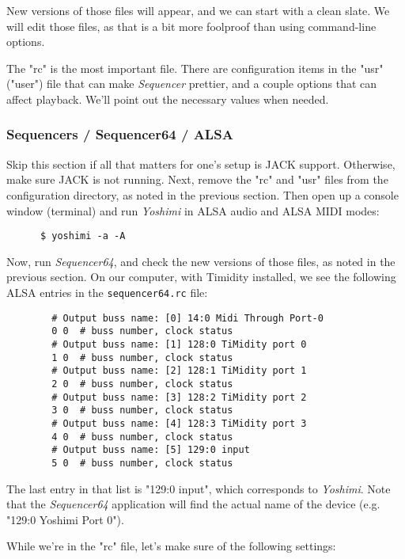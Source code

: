    New versions of those files will appear, and we can start with a clean
   slate.  We will edit those files, as that is a bit more foolproof than using
   command-line options.

   The "rc" is the most important file.  There are configuration items in the
   "usr" ("user") file that can make \textsl{Sequencer} prettier, and a couple
   options that can affect playback.  We'll point out the necessary values when
   needed.

\subsubsection{Sequencers / Sequencer64 / ALSA}
\label{subsubsec:sequencers_seq64_alsa}

   Skip this section if all that matters for one's setup is JACK support.
   Otherwise, make sure JACK is not running.
   Next, remove the "rc" and "usr" files from the configuration directory, as
   noted in the previous section.
   Then open up a console window (terminal) and run \textsl{Yoshimi} in ALSA
   audio and ALSA MIDI modes:

   \begin{verbatim}
      $ yoshimi -a -A
   \end{verbatim}

   Now, run \textsl{Sequencer64}, and check the new
   versions of those files, as noted in the previous section.
   On our computer, with Timidity installed, we see the following ALSA entries
   in the \texttt{sequencer64.rc} file:

   \begin{verbatim}
		# Output buss name: [0] 14:0 Midi Through Port-0
		0 0  # buss number, clock status
		# Output buss name: [1] 128:0 TiMidity port 0
		1 0  # buss number, clock status
		# Output buss name: [2] 128:1 TiMidity port 1
		2 0  # buss number, clock status
		# Output buss name: [3] 128:2 TiMidity port 2
		3 0  # buss number, clock status
		# Output buss name: [4] 128:3 TiMidity port 3
		4 0  # buss number, clock status
		# Output buss name: [5] 129:0 input
		5 0  # buss number, clock status
   \end{verbatim}

   The last entry in that list is "129:0 input", which corresponds to
   \textsl{Yoshimi}.  Note that the \textsl{Sequencer64} application will
   find the actual name of the device (e.g. "129:0 Yoshimi Port 0").
   
   While we're in the "rc" file, let's make sure of the following settings:

